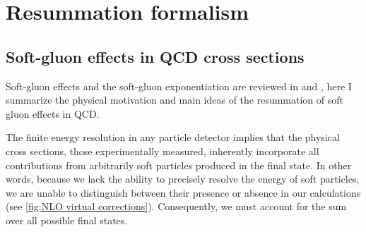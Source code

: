 \documentclass[../main.tex]{subfiles}
\begin{document}
\chapter{Resummation formalism}\label{ch:resummation}

\section{Soft-gluon effects in QCD cross sections} \label{sec:Soft_gluon_effects}

Soft-gluon effects and the soft-gluon exponentiation are reviewed in \cite{Catani_1997} and \cite{catani1997softgluon}, here I summarize the physical 
motivation and main ideas of the resummation of soft gluon effects in QCD.

The finite energy resolution in any particle detector implies that the physical cross sections, 
those experimentally measured, inherently incorporate all contributions from arbitrarily soft particles 
produced in the final state. In other words, because we lack the ability to precisely resolve the energy 
of soft particles, we are unable to distinguish between their presence or absence in our calculations (see \cref{fig:NLO virtual corrections}). 
Consequently, we must account for the sum over all possible final states.
\end{document}
